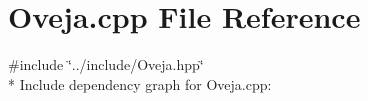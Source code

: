 \section{Oveja.\+cpp File Reference}
\label{_oveja_8cpp}
{\ttfamily \#include \char`\"{}../include/\+Oveja.\+hpp\char`\"{}}\\*
Include dependency graph for Oveja.\+cpp\+:
